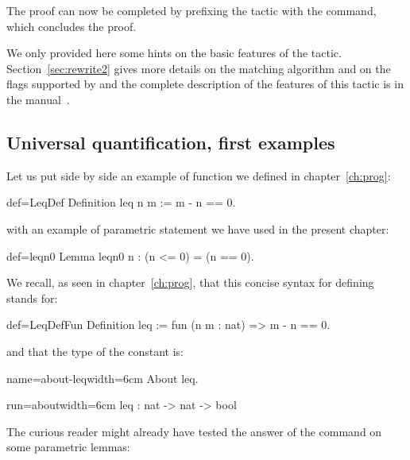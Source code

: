 The proof can now be completed by prefixing the tactic with the
 command, which concludes the proof.

We only provided here some hints on the basic features of the 
tactic. Section~\ref{sec:rewrite2} gives more details on the matching
algorithm and on the flags supported by  and the complete
description of the features of this tactic is in the manual~\cite{ssrman}.



\subsection{Universal quantification, first examples}

Let us put side by side an example of function we defined in
chapter~\ref{ch:prog}:

\begin{coq}{def=LeqDef}{}
Definition leq n m := m - n == 0.
\end{coq}
with an example of parametric statement we have used in the present
chapter:

\begin{coq}{def=leqn0}{}
Lemma leqn0 n : (n <= 0) = (n == 0).
\end{coq}

We recall, as seen in chapter~\ref{ch:prog}, that this concise syntax
for defining  stands for:

\begin{coq}{def=LeqDefFun}{}
Definition leq := fun (n m : nat) => m - n == 0.
\end{coq}
and that the type of the constant  is:

\begin{coq}{name=about-leq}{width=6cm}
About leq.
\end{coq}
\begin{coqout}{run=about}{width=6cm}
leq : nat -> nat -> bool
\end{coqout}

The curious reader might already have tested the answer of the
 command on some parametric lemmas:

